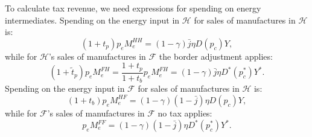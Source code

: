 \documentclass[notitlepage,12pt]{article}
\begin{document}
To calculate tax revenue, we need expressions for spending on energy
intermediates. Spending on the energy input in $\mathcal{H}$ for sales of
manufactures in $\mathcal{H}$ is:%
\begin{equation*}
(1+t_{p})p_{e}M_{e}^{HH}=\left( 1-\gamma \right) \bar{j}\eta D(p_{c})Y,
\end{equation*}%
while for $\mathcal{H}$'s sales of manufactures in $\mathcal{F}$ the border
adjustment applies:%
\begin{equation*}
\left( 1+\tilde{t}_{p}\right) p_{e}M_{e}^{FH}=\frac{1+t_{p}}{1+t_{b}}%
p_{e}M_{e}^{FH}=\left( 1-\gamma \right) \bar{j}\eta D^{\ast }(p_{c}^{\ast
})Y^{\ast }.
\end{equation*}%
Spending on the energy input in $\mathcal{F}$ for sales of manufactures in $%
\mathcal{H}$ is:%
\begin{equation*}
\left( 1+t_{b}\right) p_{e}M_{e}^{HF}=\left( 1-\gamma \right) \left( 1-\bar{j%
}\right) \eta D(p_{c})Y,
\end{equation*}%
while for $\mathcal{F}$'s sales of manufactures in $\mathcal{F}$ no tax
applies:%
\begin{equation*}
p_{e}M_{e}^{FF}=\left( 1-\gamma \right) \left( 1-\bar{j}\right) \eta D^{\ast
}(p_{c}^{\ast })Y^{\ast }.
\end{equation*}
\end{document}
